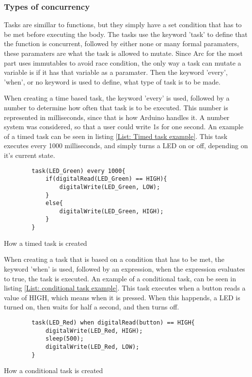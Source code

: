 \subsubsection{Types of concurrency}
Tasks are simillar to functions, but they simply have a set condition that has to be met before executing the body. The tasks use the keyword 'task' to define that the function is concurrent, followed by either none or many formal paramaters, these paramaters are what the task is allowed to mutate. Since Arc for the most part uses immutables to avoid race condition, the only way a task can mutate a variable is if it has that variable as a paramater. Then the keyword 'every', 'when', or no keyword is used to define, what type of task is to be made.

When creating a time based task, the keyword 'every' is used, followed by a number to determine how often that task is to be executed. This number is represented in milliseconds, since that is how Arduino handles it. A number system was considered, so that a user could write 1s for one second.
An example of a timed task can be seen in listing \ref*{List: Timed task example}. This task executes every 1000 milliseconds, and simply turns a LED on or off, depending on it's current state.


\begin{listing}[htb!]
    \begin{verbatim}
        task(LED_Green) every 1000{
            if(digitalRead(LED_Green) == HIGH){
                digitalWrite(LED_Green, LOW);
            }
            else{
                digitalWrite(LED_Green, HIGH);
            }
        }
    \end{verbatim}
    \caption{How a timed task is created}
    \label{List: Timed task example}
\end{listing}


When creating a task that is based on a condition that has to be met, the keyword 'when' is used, followed by an expression, when the expression evaluates to true, the task is executed. An example of a conditional task, can be seen in listing \ref*{List: conditional task example}. This task executes when a button reads a value of HIGH, which means when it is pressed. When this happends, a LED is turned on, then waits for half a second, and then turns off.


\begin{listing}[htb!]
    \begin{verbatim}
        task(LED_Red) when digitalRead(button) == HIGH{
            digitalWrite(LED_Red, HIGH);
            sleep(500);
            digitalWrite(LED_Red, LOW); 
        }
    \end{verbatim}
    \caption{How a conditional task is created}
    \label{List: conditional task example}
\end{listing}


